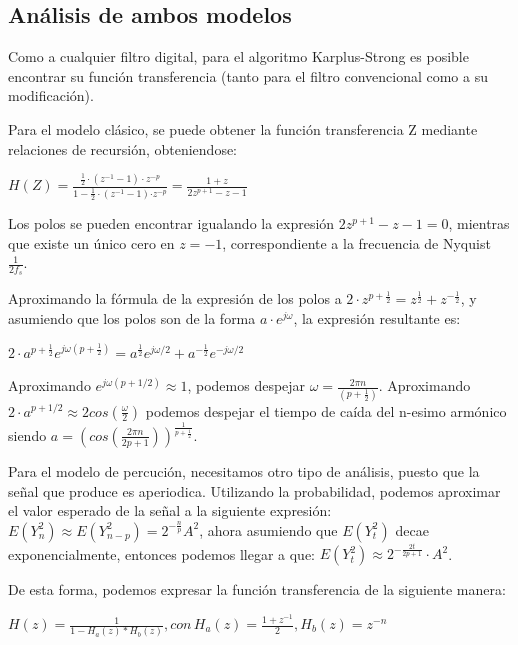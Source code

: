 \documentclass[../ASSD_TP2.tex]{subfiles}
\begin{document}
\subsection{Análisis de ambos modelos}

Como a cualquier filtro digital, para el algoritmo Karplus-Strong
es posible encontrar su función transferencia (tanto para el filtro
convencional como a su modificación).

Para el modelo clásico, se puede obtener la función transferencia
Z mediante relaciones de recursión, obteniendose:
\begin{center}
$H(Z)=\frac{\frac{1}{2}\cdot(z^{-1}-1)\cdot z^{-p}}{1-\frac{1}{2}\cdot(z^{-1}-1)\text{·}z^{-p}}=\frac{1+z}{2z^{p+1}-z-1}$
\par\end{center}

Los polos se pueden encontrar igualando la expresión $2z^{p+1}-z-1=0$,
mientras que existe un único cero en $z=-1$, correspondiente a la
frecuencia de Nyquist $\frac{1}{2f_{s}}.$

Aproximando la fórmula de la expresión de los polos a $2\cdot z^{p+\frac{1}{2}}=z^{\frac{1}{2}}+z^{-\frac{1}{2}}$,
y asumiendo que los polos son de la forma $a\cdot e^{j\omega}$, la
expresión resultante es:
\begin{center}
$2\cdot a^{p+\frac{1}{2}}e^{j\omega(p+\frac{1}{2})}=a^{\frac{1}{2}}e^{j\omega/2}+a^{-\frac{1}{2}}e^{-j\omega/2}$
\par\end{center}

Aproximando $e^{j\omega(p+1/2)}\approx1$, podemos despejar $\omega=\frac{2\pi n}{(p+\frac{1}{2})}$.
Aproximando $2\cdot a^{p+1/2}\approx2cos(\frac{\omega}{2})$ podemos
despejar el tiempo de caída del n-esimo armónico siendo $a=(cos(\frac{2\pi n}{2p+1}))^{\frac{1}{p+\frac{1}{2}}}$.

Para el modelo de percución, necesitamos otro tipo de análisis, puesto
que la señal que produce es aperiodica. Utilizando la probabilidad,
podemos aproximar el valor esperado de la señal a la siguiente expresión:
$E(Y_{n}^{2})\approx E(Y_{n-p}^{2})=2^{-\frac{n}{p}}A^{2}$, ahora
asumiendo que $E(Y_{t}^{2})$ decae exponencialmente, entonces podemos
llegar a que: $E(Y_{t}^{2})\approx2^{-\frac{2t}{2p+1}}\cdot A^{2}$.

De esta forma, podemos expresar la función transferencia de la siguiente
manera:
\begin{center}
$H(z)=\frac{1}{1-H_{a}(z)*H_{b}(z)},con\,H_{a}(z)=\frac{1+z^{-1}}{2},H_{b}(z)=z^{-n}$
\par\end{center}
\end{document}
